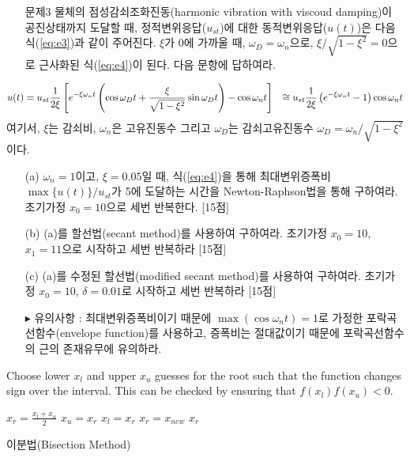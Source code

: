 \documentclass[a4,10pt]{article}
\theoremstyle{examplestyle}
\let\\\tabularnewline
\let\\\tabularnewline
\begin{document}
\begin{itemize}
\item[문제3] 물체의 점성감쇠조화진동(harmonic vibration with viscoud damping)이 공진상태까지 도달할 때, 정적변위응답($u_{st}$)에 대한 동적변위응답($u(t)$)은 다음 식(\ref{eq:e3})과 같이 주어진다. $\xi$가 $0$에 가까울 때, $\omega_{D}=\omega_{n}$으로, $\xi/\sqrt{1-\xi^2}=0$으로 근사화된 식(\ref{eq:e4})이 된다. 다음 문항에 답하여라.
\end{itemize}
\begin{align}
u(t)&=u_{st}\frac{1}{2\xi}\left[e^{-\xi\omega_{n}t}\left(\cos\omega_{D}t+\frac{\xi}{\sqrt{1-\xi^2}}\sin\omega_{D}t\right)-\cos\omega_{n}t\right]\label{eq:e3}\\
&\cong u_{st}\frac{1}{2\xi}\left(e^{-\xi\omega_{n}t}-1\right)\cos\omega_{n}t\label{eq:e4}
\end{align}
여기서, $\xi$는 감쇠비, $\omega_{n}$은 고유진동수 그리고 $\omega_{D}$는 감쇠고유진동수 $\omega_{D}=\omega_{n}/\sqrt{1-\xi^2}$이다.
\begin{itemize}
\item[(a)] $\omega_{n}=1$이고, $\xi=0.05$일 때, 식(\ref{eq:e4})을 통해 최대변위증폭비 $\max\{u(t)\}/u_{st}$가 5에 도달하는 시간을 Newton-Raphson법을 통해 구하여라. 초기가정 $x_{0}=10$으로 세번 반복한다. [15점]
\item[(b)] (a)를 할선법(secant method)를 사용하여 구하여라. 초기가정 $x_{0}=10$, $x_{1}=11$으로 시작하고 세번 반복하라 [15점]
\item[(c)] (a)를 수정된 할선법(modified secant method)를 사용하여 구하여라. 초기가정 $x_{0}=10$, $\delta=0.01$로 시작하고 세번 반복하라 [15점]
\item[$\blacktriangleright$]유의사항 : 최대변위증폭비이기 때문에 $\max(\cos\omega_{n}t)=1$로 가정한 포락곡선함수(envelope function)를 사용하고, 증폭비는 절대값이기 때문에 포락곡선함수의 근의 존재유무에 유의하라.
\end{itemize}
\clearpage

\begin{algorithm}\label{alg:c5}
Choose lower $x_{l}$ and upper $x_{u}$ guesses for the root such that the function changes sign over the interval. This can be checked by ensuring that $f(x_{l})f(x_{u})<0$.
\begin{algorithmic}
  \State $x_{r}=\frac{x_{l}+x_{u}}{2}$
    \State $x_{u}=x_{r}$
  \Else
    \State $x_{l}=x_{r}$
  \EndIf  
    \State $x_{r}=x_{new}$
    \State \Return $x_{r}$
  \EndIf
\EndWhile
\end{algorithmic}
\caption{이분법(Bisection Method)}
\end{algorithm}
\end{document}
